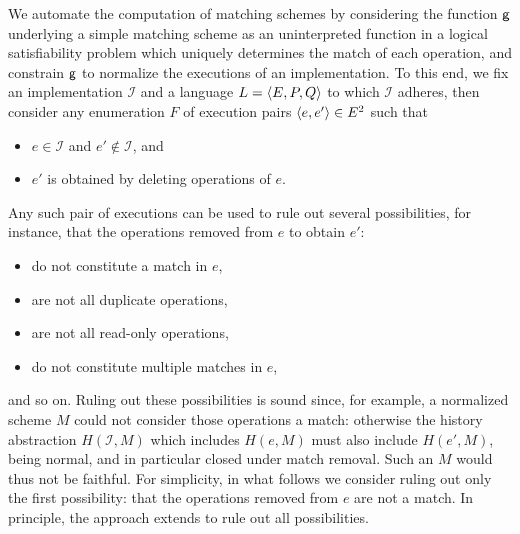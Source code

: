 We automate the computation of matching schemes by considering the function
${\sf g}$ underlying a simple matching scheme as an uninterpreted function in a
logical satisfiability problem which uniquely determines the match of each
operation, and constrain ${\sf g}$ to normalize the executions of an
implementation. To this end, we fix an implementation $\mathcal{I}$ and a
language $L = {\left\langle{E,P,Q}\right\rangle}$ to which $\mathcal{I}$ adheres, then consider any
enumeration $F$ of execution pairs ${\left\langle{e,e'}\right\rangle} \in E^2$ such that
\begin{itemize}

  \item $e \in \mathcal{I}$ and $e' \not\in \mathcal{I}$, and

  \item $e'$ is obtained by deleting operations of $e$.

\end{itemize}
Any such pair of executions can be used to rule out several possibilities,
for instance, that the operations removed from $e$ to obtain $e'$:
\begin{itemize}

  \item do not constitute a match in $e$,

  \item are not all duplicate operations,

  \item are not all read-only operations,

  \item do not constitute multiple matches in $e$,

\end{itemize}
and so on. Ruling out these possibilities is sound since, for example, a
normalized scheme $M$ could not consider those operations a match: otherwise
the history abstraction $H(\mathcal{I},M)$ which includes $H(e,M)$ must also
include $H(e',M)$, being normal, and in particular closed under match removal.
Such an $M$ would thus not be faithful. For simplicity, in what follows we
consider ruling out only the first possibility: that the operations removed
from $e$ are not a match. In principle, the approach extends to rule out all
possibilities.

